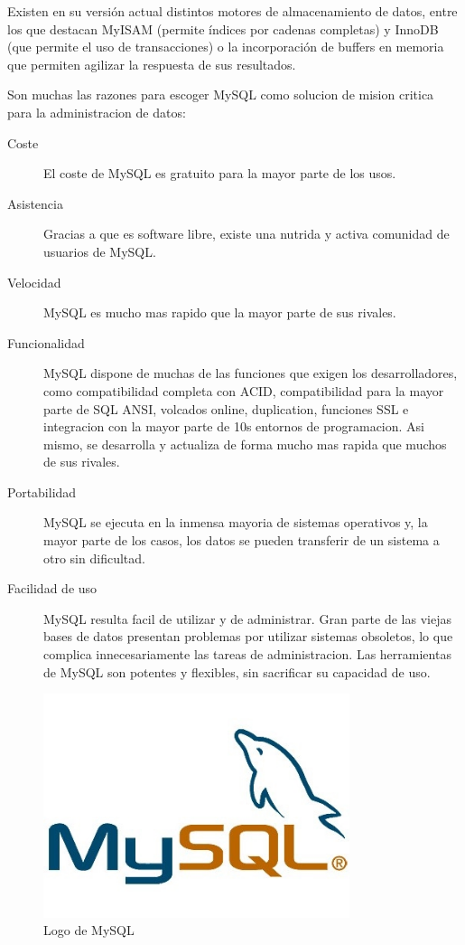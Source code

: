 Existen en su versión actual distintos motores de almacenamiento de datos, entre los que destacan MyISAM (permite índices por cadenas completas) y InnoDB (que permite el uso de transacciones) o la incorporación de buffers en memoria que permiten agilizar la respuesta de sus resultados. 

Son muchas las razones para escoger MySQL como solucion de mision critica
para la administracion de datos:

\begin{description}
    \item[Coste] El coste de MySQL es gratuito para la mayor parte de los usos.
    \item[Asistencia] Gracias a que es software libre, existe una nutrida y activa comunidad de usuarios de MySQL.
    \item[Velocidad]  MySQL es mucho mas rapido que la mayor parte de sus rivales.
    \item[Funcionalidad] MySQL dispone de muchas de las funciones que exigen los desarrolladores, como compatibilidad completa con ACID,  compatibilidad para la mayor parte de SQL ANSI, volcados online, duplication, funciones SSL e integracion con la mayor parte de 10s entornos de programacion. Asi mismo, se desarrolla y actualiza de forma mucho mas rapida que muchos de sus rivales.
    \item[Portabilidad] MySQL se ejecuta en la inmensa mayoria de sistemas operativos y, la mayor parte de los casos, los datos se pueden transferir de un sistema a otro sin dificultad.
    \item[Facilidad de uso] MySQL resulta facil de utilizar y de administrar. Gran parte de las viejas bases de datos presentan problemas por utilizar sistemas obsoletos, lo que complica innecesariamente las tareas de administracion. Las herramientas de MySQL son potentes y flexibles, sin sacrificar su capacidad de uso.
\end{description}

\begin{figure}[ht]
    \centering
    \includegraphics[width=0.8\textwidth]{imagenes/logo-mysql.jpg}
    \caption{Logo de MySQL}
    \label{fig:logomysql}
\end{figure}

